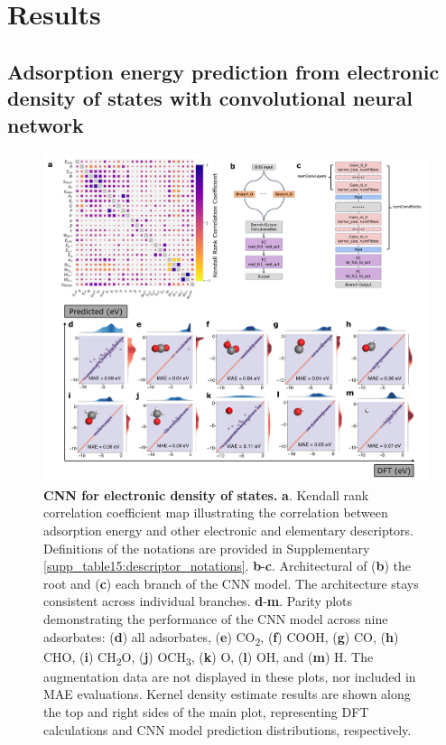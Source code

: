 \documentclass[a4paper, 12pt, titlepage]{article}
\begin{document}
\newpage
\section{Results}

\subsection{Adsorption energy prediction from electronic density of states with convolutional neural network}

    \begin{figure}[htbp]
        \centering
        \includegraphics[width=\textwidth]{main_fig2_cnn.png}
        \caption{\textbf{CNN for electronic density of states.}
        \textbf{a}. Kendall rank correlation coefficient map illustrating the correlation
        between adsorption energy and other electronic and elementary descriptors.
        Definitions of the notations are provided in
        Supplementary \cref{supp_table15:descriptor_notations}.
        \textbf{b}-\textbf{c}. Architectural of (\textbf{b}) the root and
        (\textbf{c}) each branch of the CNN model.
        The architecture stays consistent across individual branches.
        \textbf{d}-\textbf{m}. Parity plots demonstrating the performance of the
        CNN model across nine adsorbates:
        (\textbf{d}) all adsorbates, (\textbf{e}) CO\textsubscript{2}, (\textbf{f}) COOH,
        (\textbf{g}) CO, (\textbf{h}) CHO, (\textbf{i}) CH\textsubscript{2}O,
        (\textbf{j}) OCH\textsubscript{3}, (\textbf{k}) O, (\textbf{l}) OH, and (\textbf{m}) H.
        The augmentation data are not displayed in these plots, nor included in MAE evaluations.
        Kernel density estimate results are shown along the top and right sides of the main plot,
        representing DFT calculations and CNN model prediction distributions, respectively.}
        \label{main_fig2:cnn_for_eads}
    \end{figure}
\end{document}
